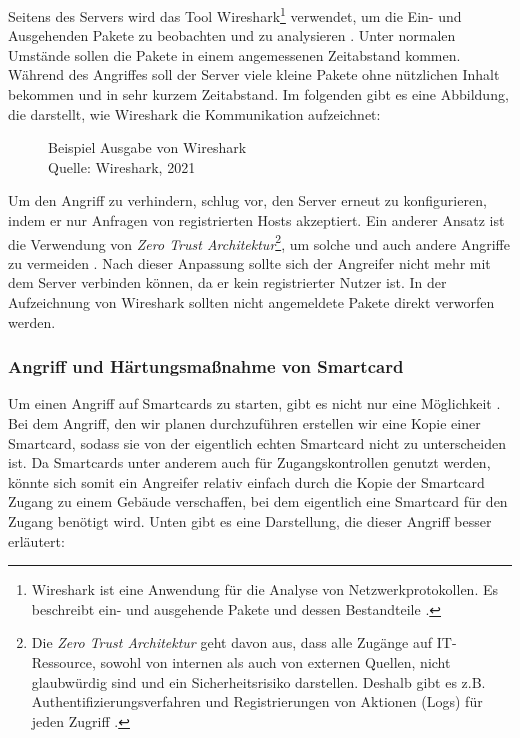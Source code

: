 Seitens des Servers wird das Tool Wireshark\footnote{Wireshark ist eine Anwendung für die Analyse von Netzwerkprotokollen.
Es beschreibt ein- und ausgehende Pakete und dessen Bestandteile \cite{refst:wisa}.} verwendet, um die Ein- und Ausgehenden
Pakete zu beobachten und zu analysieren \cite{refart:UBEC}. Unter normalen Umstände sollen die Pakete in einem angemessenen
Zeitabstand kommen. Während des Angriffes soll der Server viele kleine Pakete ohne nützlichen Inhalt bekommen und in sehr 
kurzem Zeitabstand. Im folgenden gibt es eine Abbildung, die darstellt, wie Wireshark die Kommunikation aufzeichnet:

\begin{figure}[H]
  \caption{Beispiel Ausgabe von Wireshark \\Quelle: Wireshark, 2021}
  \label{fig:refst_wisa}
\end{figure}

Um den Angriff zu verhindern, schlug \cite{refip:NYRS} vor, den Server erneut zu konfigurieren, indem er nur Anfragen von
registrierten Hosts akzeptiert. Ein anderer Ansatz ist die Verwendung von \textit{Zero Trust Architektur}\footnote{Die 
\textit{Zero Trust Architektur} geht davon aus, dass alle Zugänge auf IT-Ressource, sowohl von internen als auch von
externen Quellen, nicht glaubwürdig sind und ein Sicherheitsrisiko darstellen. Deshalb gibt es z.B. Authentifizierungsverfahren
und Registrierungen von Aktionen (Logs) für jeden Zugriff \cite{refart:EBZT}.}, um solche und auch andere Angriffe 
zu vermeiden \cite{refip:LYSP}.  Nach dieser Anpassung sollte sich der Angreifer nicht mehr mit dem Server
verbinden können, da er kein registrierter Nutzer ist. In der Aufzeichnung von Wireshark sollten nicht angemeldete Pakete direkt
verworfen werden.


\subsubsection{Angriff und Härtungsmaßnahme von Smartcard}
Um einen Angriff auf Smartcards zu starten, gibt es nicht nur eine Möglichkeit \cite{refart:TKSK}. Bei dem Angriff, den wir planen 
durchzuführen erstellen wir eine Kopie einer Smartcard, sodass sie von der eigentlich echten Smartcard nicht zu unterscheiden ist.
Da Smartcards unter anderem auch für Zugangskontrollen genutzt werden, könnte sich somit ein Angreifer relativ einfach durch 
die Kopie der Smartcard Zugang zu einem Gebäude verschaffen, bei dem eigentlich eine Smartcard für den Zugang benötigt wird.
Unten gibt es eine Darstellung, die dieser Angriff besser erläutert:


